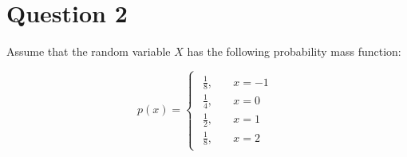 \documentclass[12pt]{article}
\begin{document}
	
	\section*{Question 2}
	
	\noindent Assume that the random variable $X$ has the following probability mass function:
	
	\[
		p(x) =
		\begin{cases}
			\begin{aligned}
				\frac{1}{8},&\quad x = -1\\
				\frac{1}{4},&\quad x = 0\\
				\frac{1}{2},&\quad x = 1\\
				\frac{1}{8},&\quad x = 2
			\end{aligned}
		\end{cases}
	\]
	
	\bigskip
	
\end{document}
